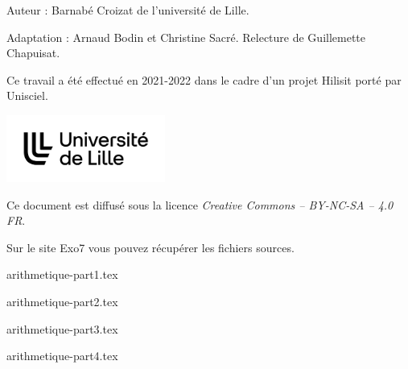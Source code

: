 \documentclass[11pt,a4paper]{report}
\begin{document}
\bigskip
\bigskip



\vfill

\begin{center}
\begin{minipage}{0.8\textwidth}
\center
Auteur : Barnabé Croizat de l'université de Lille.

Adaptation : Arnaud Bodin et Christine Sacré.
Relecture de Guillemette Chapuisat.

  \medskip
  
Ce travail a été effectué en 2021-2022 dans le cadre d'un projet Hilisit porté par Unisciel.
\end{minipage}

  \medskip

\qquad\qquad
\includegraphics[height=2.2cm]{logo-ulille}

  \medskip
  
Ce document est diffusé sous la licence \emph{Creative Commons -- BY-NC-SA -- 4.0 FR}.


Sur le site Exo7 vous pouvez récupérer les fichiers sources.

\vspace*{0cm}

\end{center}


\newpage



{arithmetique-part1.tex}
\newpage

{arithmetique-part2.tex}
\newpage

{arithmetique-part3.tex}
\newpage

{arithmetique-part4.tex}
\newpage


\end{document}
